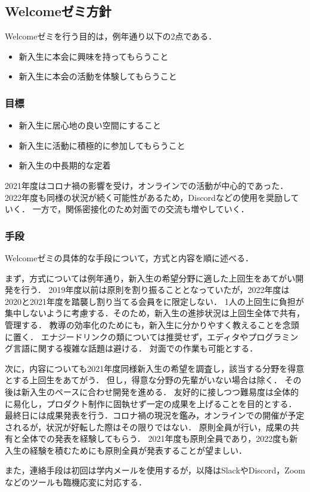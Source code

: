 \subsection*{Welcomeゼミ方針}



Welcomeゼミを行う目的は，例年通り以下の2点である．

\begin{itemize}
    \item 新入生に本会に興味を持ってもらうこと
    \item 新入生に本会の活動を体験してもらうこと
\end{itemize}

\subsubsection*{目標}
\begin{itemize}
    \item 新入生に居心地の良い空間にすること
    \item 新入生に活動に積極的に参加してもらうこと
    \item 新入生の中長期的な定着
\end{itemize}

2021年度はコロナ禍の影響を受け，オンラインでの活動が中心的であった．
2022年度も同様の状況が続く可能性があるため，Discordなどの使用を奨励していく．
一方で，関係密接化のため対面での交流も増やしていく．

\subsubsection*{手段}
Welcomeゼミの具体的な手段について，方式と内容を順に述べる．

まず，方式については例年通り，新入生の希望分野に適した上回生をあてがい開発を行う．
2019年度以前は原則\secondGrade{}を割り振ることとなっていたが，2022年度は2020と2021年度を踏襲し割り当てる会員を\secondGrade{}に限定しない．
1人の上回生に負担が集中しないように考慮する．そのため，新入生の進捗状況は上回生全体で共有，管理する．
教導の効率化のためにも，新入生に分かりやすく教えることを念頭に置く．
エナジードリンクの類については推奨せず，エディタやプログラミング言語に関する複雑な話題は避ける．
対面での作業も可能とする．

次に，内容についても2021年度同様新入生の希望を調査し，該当する分野を得意とする上回生をあてがう．
但し，得意な分野の先輩がいない場合は除く．
その後は新入生のペースに合わせ開発を進める．
友好的に接しつつ難易度は全体的に易化し，プロダクト制作に固執せず一定の成果を上げることを目的とする．
最終日には成果発表を行う．コロナ禍の現況を鑑み，オンラインでの開催が予定されるが，状況が好転した際はその限りではない．
原則全員が行い，成果の共有と全体での発表を経験してもらう．
2021年度も原則全員であり，2022度も新入生の経験を積むためにも原則全員が発表することが望ましい．

また，連絡手段は初回は学内メールを使用するが，以降はSlackやDiscord，Zoomなどのツールも臨機応変に対応する．
